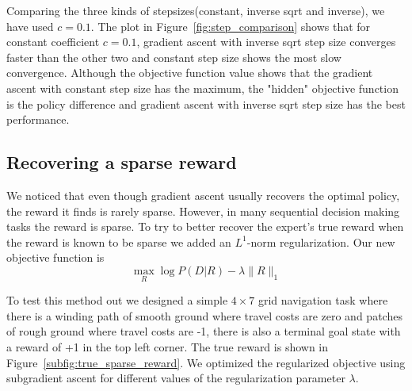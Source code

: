 \documentclass[10pt,a4paper]{article}
\begin{document}
Comparing the three kinds of stepsizes(constant, inverse sqrt and inverse), we have used $c=0.1$. The plot in Figure~\ref{fig:step_comparison} shows that for constant coefficient $c=0.1$, gradient ascent with inverse sqrt step size converges faster than the other two and constant step size shows the most slow convergence. Although the objective function value shows that the gradient ascent with constant step size has the maximum, the "hidden" objective function is the policy difference and gradient ascent with inverse sqrt step size has the best performance.


\subsection{Recovering a sparse reward}
We noticed that even though gradient ascent usually recovers the optimal policy, the reward it finds is rarely sparse. However, in many sequential decision making tasks the reward is sparse. To try to better recover the expert's true reward when the reward is known to be sparse we added an $L^1$-norm regularization. Our new objective function is 
\begin{equation}
\max_R \log P(D|R) - \lambda \|R\|_1
\end{equation}

To test this method out we designed a simple $4\times 7$ grid navigation task where there is a winding path of smooth ground where travel costs are zero and patches of rough ground where travel costs are -1, there is also a terminal goal state with a reward of +1 in the top left corner. The true reward is shown in Figure~\ref{subfig:true_sparse_reward}. We optimized the regularized objective using subgradient ascent for different values of the regularization parameter $\lambda$.
\end{document}
